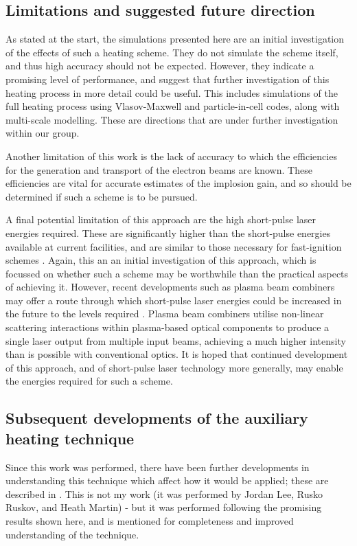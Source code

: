 \subsection{Limitations and suggested future direction}

As stated at the start, the simulations presented here are an initial investigation of the effects of such a heating scheme. They do not simulate the scheme itself, and thus high accuracy should not be expected. However, they indicate a promising level of performance, and suggest that further investigation of this heating process in more detail could be useful. This includes simulations of the full heating process using Vlasov-Maxwell and particle-in-cell codes, along with multi-scale modelling. These are directions that are under further investigation within our group.

Another limitation of this work is the lack of accuracy to which the efficiencies for the generation and transport of the electron beams are known. These efficiencies are vital for accurate estimates of the implosion gain, and so should be determined if such a scheme is to be pursued.

A final potential limitation of this approach are the high short-pulse laser energies required. These are significantly higher than the short-pulse energies available at current facilities, and are similar to those necessary for fast-ignition schemes \cite{Strozzi2012}. Again, this an an initial investigation of this approach, which is focussed on whether such a scheme may be worthwhile than the practical aspects of achieving it. However, recent developments such as plasma beam combiners \cite{Kirkwood2018,Kirkwood2018a} may offer a route through which short-pulse laser energies could be increased in the future to the levels required \cite{KirkwoodPersonalComm}. Plasma beam combiners utilise non-linear scattering interactions within plasma-based optical components to produce a single laser output from multiple input beams, achieving a much higher intensity than is possible with conventional optics. It is hoped that continued development of this approach, and of short-pulse laser technology more generally, may enable the energies required for such a scheme.

\subsection{Subsequent developments of the auxiliary heating technique} \label{sec:AuxHeatingDevlopments}
Since this work was performed, there have been further developments in understanding this technique which affect how it would be applied; these are described in \cite{Lee2023}. This is not my work (it was performed by Jordan Lee, Rusko Ruskov, and Heath Martin) - but it was performed following the promising results shown here, and is mentioned for completeness and improved understanding of the technique.

